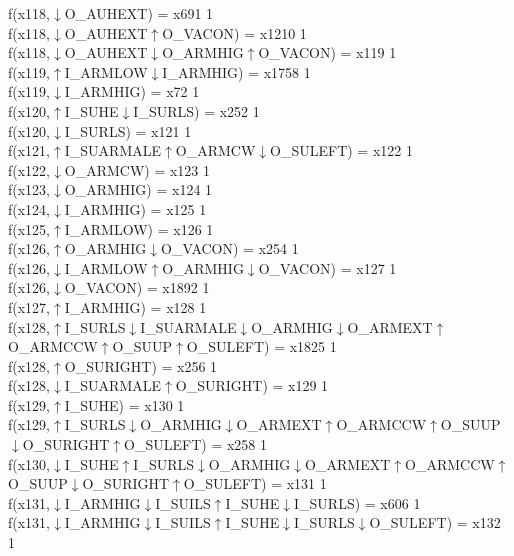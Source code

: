 f(x118,$\downarrow$O\_AUHEXT) = x691 {1} \\
f(x118,$\downarrow$O\_AUHEXT$\uparrow$O\_VACON) = x1210 {1} \\
f(x118,$\downarrow$O\_AUHEXT$\downarrow$O\_ARMHIG$\uparrow$O\_VACON) = x119 {1} \\
f(x119,$\uparrow$I\_ARMLOW$\downarrow$I\_ARMHIG) = x1758 {1} \\
f(x119,$\downarrow$I\_ARMHIG) = x72 {1} \\
f(x120,$\uparrow$I\_SUHE$\downarrow$I\_SURLS) = x252 {1} \\
f(x120,$\downarrow$I\_SURLS) = x121 {1} \\
f(x121,$\uparrow$I\_SUARMALE$\uparrow$O\_ARMCW$\downarrow$O\_SULEFT) = x122 {1} \\
f(x122,$\downarrow$O\_ARMCW) = x123 {1} \\
f(x123,$\downarrow$O\_ARMHIG) = x124 {1} \\
f(x124,$\downarrow$I\_ARMHIG) = x125 {1} \\
f(x125,$\uparrow$I\_ARMLOW) = x126 {1} \\
f(x126,$\uparrow$O\_ARMHIG$\downarrow$O\_VACON) = x254 {1} \\
f(x126,$\downarrow$I\_ARMLOW$\uparrow$O\_ARMHIG$\downarrow$O\_VACON) = x127 {1} \\
f(x126,$\downarrow$O\_VACON) = x1892 {1} \\
f(x127,$\uparrow$I\_ARMHIG) = x128 {1} \\
f(x128,$\uparrow$I\_SURLS$\downarrow$I\_SUARMALE$\downarrow$O\_ARMHIG$\downarrow$O\_ARMEXT$\uparrow$O\_ARMCCW$\uparrow$O\_SUUP$\uparrow$O\_SULEFT) = x1825 {1} \\
f(x128,$\uparrow$O\_SURIGHT) = x256 {1} \\
f(x128,$\downarrow$I\_SUARMALE$\uparrow$O\_SURIGHT) = x129 {1} \\
f(x129,$\uparrow$I\_SUHE) = x130 {1} \\
f(x129,$\uparrow$I\_SURLS$\downarrow$O\_ARMHIG$\downarrow$O\_ARMEXT$\uparrow$O\_ARMCCW$\uparrow$O\_SUUP$\downarrow$O\_SURIGHT$\uparrow$O\_SULEFT) = x258 {1} \\
f(x130,$\downarrow$I\_SUHE$\uparrow$I\_SURLS$\downarrow$O\_ARMHIG$\downarrow$O\_ARMEXT$\uparrow$O\_ARMCCW$\uparrow$O\_SUUP$\downarrow$O\_SURIGHT$\uparrow$O\_SULEFT) = x131 {1} \\
f(x131,$\downarrow$I\_ARMHIG$\downarrow$I\_SUILS$\uparrow$I\_SUHE$\downarrow$I\_SURLS) = x606 {1} \\
f(x131,$\downarrow$I\_ARMHIG$\downarrow$I\_SUILS$\uparrow$I\_SUHE$\downarrow$I\_SURLS$\downarrow$O\_SULEFT) = x132 {1} \\
